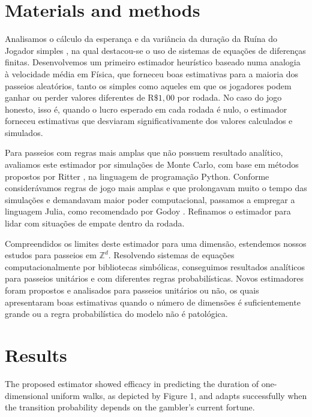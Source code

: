 \documentclass[a4paper,10pt,twocolumn]{article}
\begin{document}
\section{Materials and methods}

Analisamos o cálculo da esperança e da variância da duração da Ruína do Jogador
simples \cite{andel_variance_2012}, na qual destacou-se o uso de sistemas de
equações de diferenças finitas. Desenvolvemos um primeiro estimador heurístico
baseado numa analogia à velocidade média em Física, que forneceu boas
estimativas  para a maioria dos passeios aleatórios, tanto os simples como
aqueles em que os jogadores podem ganhar ou perder valores diferentes de
$\mathrm{R}\$1,00$ por rodada. No caso do jogo honesto, isso é, quando o lucro
esperado em cada rodada é nulo, o estimador forneceu estimativas que desviaram
significativamente dos valores calculados e simulados.

Para passeios com regras mais amplas que não possuem resultado analítico,
avaliamos este estimador por simulações de Monte Carlo, com base em métodos
propostos por Ritter \cite{ritter_determining_2011}, na linguagem de programação
Python. Conforme considerávamos regras de jogo mais amplas e que prolongavam
muito o tempo das simulações e demandavam maior poder computacional, passamos a
empregar a linguagem Julia, como recomendado por Godoy
\cite{godoy_evaluating_2023}. Refinamos o estimador para lidar com situações de
empate dentro da rodada.

Compreendidos os limites deste estimador para uma dimensão, estendemos nossos
estudos para passeios em $\mathbb{Z}^d$. Resolvendo sistemas de equações
computacionalmente por bibliotecas simbólicas, conseguimos resultados analíticos
para passeios unitários e com diferentes regras probabilísticas. Novos
estimadores foram propostos e analisados para passeios unitários ou não, os
quais apresentaram boas estimativas quando o número de dimensões é
suficientemente grande ou a regra probabilística do modelo não é patológica.

\section{Results}

The proposed estimator showed efficacy in predicting the duration of
one-dimensional uniform walks, as depicted by Figure 1, and adapts successfully
when the transition probability depends on the gambler's current fortune.
\end{document}
